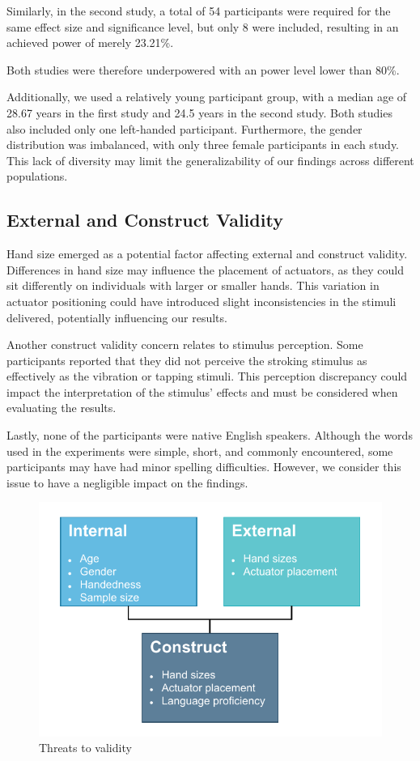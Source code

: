 Similarly, in the second study, a total of 54 participants were required for the same effect size and significance level, but only 8 were included, resulting in an achieved power of merely 23.21\%. 

Both studies were therefore underpowered with an power level lower than 80\%.


Additionally, we used a relatively young participant group, with a median age of 28.67 years in the first study and 24.5 years in the second study. Both studies also included only one left-handed participant. Furthermore, the gender distribution was imbalanced, with only three female participants in each study. This lack of diversity may limit the generalizability of our findings across different populations.

\subsection{External and Construct Validity}
Hand size emerged as a potential factor affecting external and construct validity. Differences in hand size may influence the placement of actuators, as they could sit differently on individuals with larger or smaller hands. This variation in actuator positioning could have introduced slight inconsistencies in the stimuli delivered, potentially influencing our results.

Another construct validity concern relates to stimulus perception. Some participants reported that they did not perceive the stroking stimulus as effectively as the vibration or tapping stimuli. This perception discrepancy could impact the interpretation of the stimulus' effects and must be considered when evaluating the results.

Lastly, none of the participants were native English speakers. Although the words used in the experiments were simple, short, and commonly encountered, some participants may have had minor spelling difficulties. However, we consider this issue to have a negligible impact on the findings.

\begin{figure}
    \centering
    \includegraphics[width=0.5\linewidth]{src/pictures/StudyData/Threats_to_validity.drawio.pdf}
    \caption{Threats to validity}
    \label{fig:threats_to_validity}
\end{figure}


